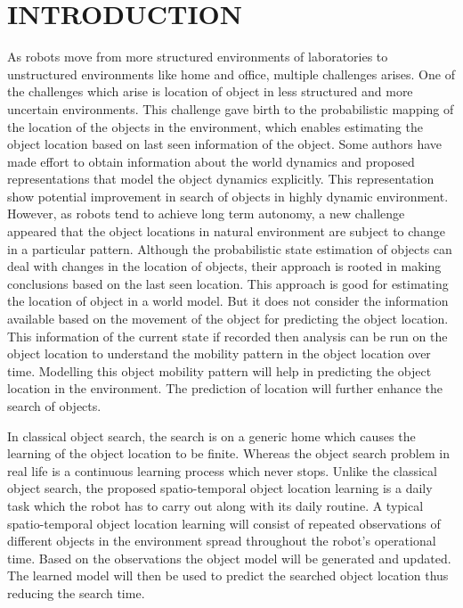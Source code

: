 
\chapter{INTRODUCTION}


As robots move from more structured environments of laboratories to
unstructured environments like home and office, multiple challenges arises. One
of the challenges which arise is location of object in less structured and more
uncertain environments. This challenge gave birth to the probabilistic mapping
of the location of the objects in the environment, which enables estimating the
object location based on last seen information of the object. Some authors have
made effort to obtain information about the world dynamics and proposed
representations that model the object dynamics explicitly. This representation
show potential improvement in search of objects in highly dynamic environment.
However, as robots tend to achieve long term autonomy, a new challenge appeared
that the object locations in natural environment are subject to change in a
particular pattern. Although the probabilistic state estimation of objects can
deal with changes in the location of objects, their approach is rooted in
making conclusions based on the last seen location. This approach is good for
estimating the location of object in a world model. But it does not consider the
information available based on the movement of the object for predicting the
object location. This information of the current state if recorded then analysis
can be run on the object location to understand the mobility pattern in the
object location over time. Modelling this object mobility pattern will help in
predicting the object location in the environment. The prediction of location
will further enhance the search of objects. 

In classical object search, the search is on a generic home which causes the learning of the object location to be finite. Whereas the object search problem in real life is a continuous learning process which
never stops. Unlike the classical object search,  the proposed spatio-temporal object location learning is a daily
task which the robot has to carry out along with its daily routine. A typical
spatio-temporal object location learning will consist of repeated observations
of different objects in the environment spread throughout the robot's
operational time. Based on the observations the object model will be generated and updated. The learned model will then be used to predict the searched object location thus reducing the search time.

